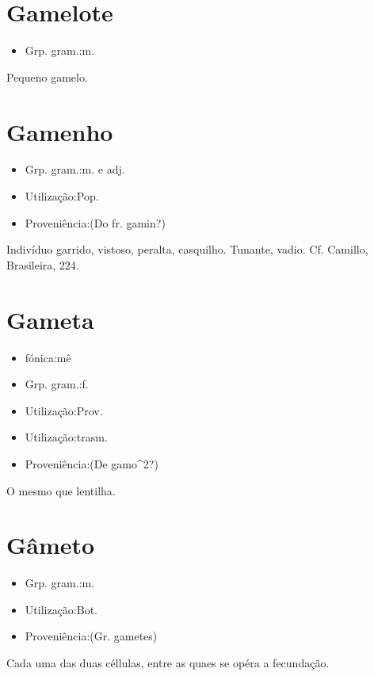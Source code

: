 \section{Gamelote}
\begin{itemize}
\item {Grp. gram.:m.}
\end{itemize}
Pequeno gamelo.
\section{Gamenho}
\begin{itemize}
\item {Grp. gram.:m.  e  adj.}
\end{itemize}
\begin{itemize}
\item {Utilização:Pop.}
\end{itemize}
\begin{itemize}
\item {Proveniência:(Do fr. \textunderscore gamin\textunderscore ?)}
\end{itemize}
Indivíduo garrido, vistoso, peralta, casquilho.
Tunante, vadio. Cf. Camillo, \textunderscore Brasileira\textunderscore , 224.
\section{Gameta}
\begin{itemize}
\item {fónica:mê}
\end{itemize}
\begin{itemize}
\item {Grp. gram.:f.}
\end{itemize}
\begin{itemize}
\item {Utilização:Prov.}
\end{itemize}
\begin{itemize}
\item {Utilização:trasm.}
\end{itemize}
\begin{itemize}
\item {Proveniência:(De \textunderscore gamo\textunderscore ^2?)}
\end{itemize}
O mesmo que \textunderscore lentilha\textunderscore .
\section{Gâmeto}
\begin{itemize}
\item {Grp. gram.:m.}
\end{itemize}
\begin{itemize}
\item {Utilização:Bot.}
\end{itemize}
\begin{itemize}
\item {Proveniência:(Gr. \textunderscore gametes\textunderscore )}
\end{itemize}
Cada uma das duas céllulas, entre as quaes se opéra a fecundação.
